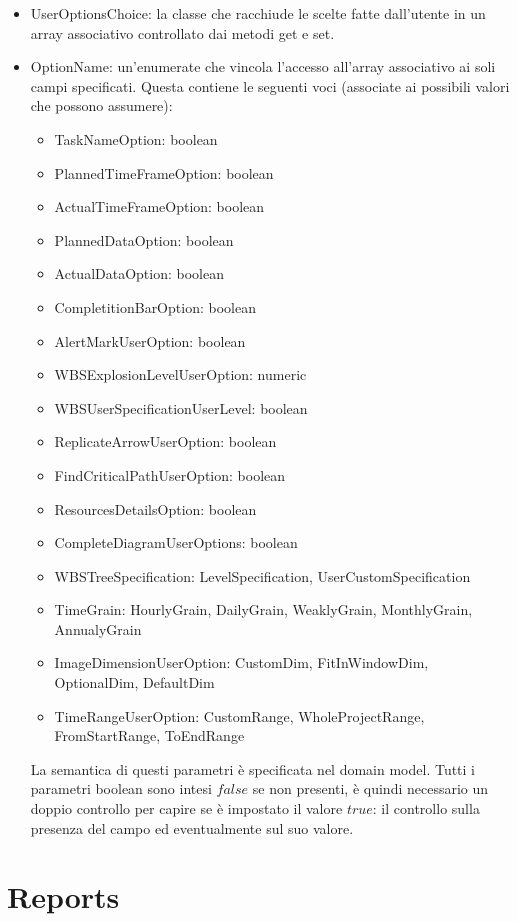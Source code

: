 \documentclass[a4paper, 12pt]{report}
\begin{document}
\begin{itemize}
	\item UserOptionsChoice: la classe che racchiude le scelte fatte dall'utente in un array associativo controllato dai metodi get e set.
	\item OptionName: un'enumerate che vincola l'accesso all'array associativo ai soli campi specificati. Questa contiene le seguenti voci (associate ai possibili valori che possono assumere):
	\begin{itemize}
		\item TaskNameOption: boolean		
		\item PlannedTimeFrameOption: boolean
		\item ActualTimeFrameOption: boolean
		\item PlannedDataOption: boolean
		\item ActualDataOption: boolean
		\item CompletitionBarOption: boolean
		\item AlertMarkUserOption: boolean
		\item WBSExplosionLevelUserOption: numeric
		\item WBSUserSpecificationUserLevel: boolean
		\item ReplicateArrowUserOption: boolean
		\item FindCriticalPathUserOption: boolean
		\item ResourcesDetailsOption: boolean
		\item CompleteDiagramUserOptions: boolean
		\item WBSTreeSpecification: LevelSpecification, UserCustomSpecification
		\item TimeGrain: HourlyGrain, DailyGrain, WeaklyGrain, MonthlyGrain, AnnualyGrain
		\item ImageDimensionUserOption: CustomDim, FitInWindowDim, OptionalDim, DefaultDim 
		\item TimeRangeUserOption: CustomRange, WholeProjectRange, FromStartRange, ToEndRange
	\end{itemize}
	La semantica di questi parametri \`e specificata nel domain model. Tutti i parametri boolean sono intesi $false$ se non presenti, \`e quindi necessario un doppio controllo per capire se \`e impostato il valore $true$: il controllo sulla presenza del campo ed eventualmente sul suo valore.
\end{itemize}

\section{Reports}
\end{document}
